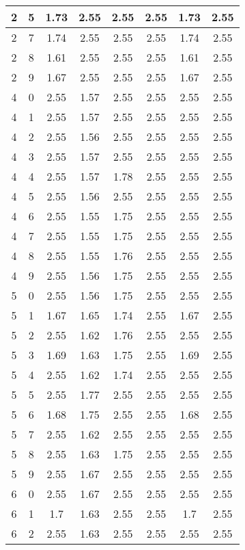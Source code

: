 \begin{longtable}{|c|c||c||c|c|c||c|c|}
	2 & 5 & 1.73 & 2.55 & 2.55 & 2.55 & 1.73 & 2.55 \\ \hline
	2 & 7 & 1.74 & 2.55 & 2.55 & 2.55 & 1.74 & 2.55 \\ \hline
	2 & 8 & 1.61 & 2.55 & 2.55 & 2.55 & 1.61 & 2.55 \\ \hline
	2 & 9 & 1.67 & 2.55 & 2.55 & 2.55 & 1.67 & 2.55 \\ \hline
	4 & 0 & 2.55 & 1.57 & 2.55 & 2.55 & 2.55 & 2.55 \\ \hline
	4 & 1 & 2.55 & 1.57 & 2.55 & 2.55 & 2.55 & 2.55 \\ \hline
	4 & 2 & 2.55 & 1.56 & 2.55 & 2.55 & 2.55 & 2.55 \\ \hline
	4 & 3 & 2.55 & 1.57 & 2.55 & 2.55 & 2.55 & 2.55 \\ \hline
	4 & 4 & 2.55 & 1.57 & 1.78 & 2.55 & 2.55 & 2.55 \\ \hline
	4 & 5 & 2.55 & 1.56 & 2.55 & 2.55 & 2.55 & 2.55 \\ \hline
	4 & 6 & 2.55 & 1.55 & 1.75 & 2.55 & 2.55 & 2.55 \\ \hline
	4 & 7 & 2.55 & 1.55 & 1.75 & 2.55 & 2.55 & 2.55 \\ \hline
	4 & 8 & 2.55 & 1.55 & 1.76 & 2.55 & 2.55 & 2.55 \\ \hline
	4 & 9 & 2.55 & 1.56 & 1.75 & 2.55 & 2.55 & 2.55 \\ \hline
	5 & 0 & 2.55 & 1.56 & 1.75 & 2.55 & 2.55 & 2.55 \\ \hline
	5 & 1 & 1.67 & 1.65 & 1.74 & 2.55 & 1.67 & 2.55 \\ \hline
	5 & 2 & 2.55 & 1.62 & 1.76 & 2.55 & 2.55 & 2.55 \\ \hline
	5 & 3 & 1.69 & 1.63 & 1.75 & 2.55 & 1.69 & 2.55 \\ \hline
	5 & 4 & 2.55 & 1.62 & 1.74 & 2.55 & 2.55 & 2.55 \\ \hline
	5 & 5 & 2.55 & 1.77 & 2.55 & 2.55 & 2.55 & 2.55 \\ \hline
	5 & 6 & 1.68 & 1.75 & 2.55 & 2.55 & 1.68 & 2.55 \\ \hline
	5 & 7 & 2.55 & 1.62 & 2.55 & 2.55 & 2.55 & 2.55 \\ \hline
	5 & 8 & 2.55 & 1.63 & 1.75 & 2.55 & 2.55 & 2.55 \\ \hline
	5 & 9 & 2.55 & 1.67 & 2.55 & 2.55 & 2.55 & 2.55 \\ \hline
	6 & 0 & 2.55 & 1.67 & 2.55 & 2.55 & 2.55 & 2.55 \\ \hline
	6 & 1 & 1.7 & 1.63 & 2.55 & 2.55 & 1.7 & 2.55 \\ \hline
	6 & 2 & 2.55 & 1.63 & 2.55 & 2.55 & 2.55 & 2.55 \\ \hline

\end{longtable}

